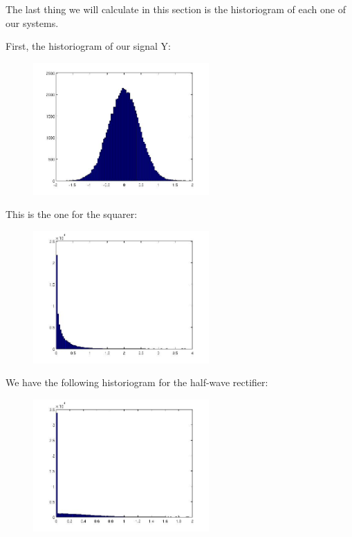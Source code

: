 \documentclass[a4paper,11pt]{article}
\begin{document}
The last thing we will calculate in this section is the historiogram of each one of our systems.

First, the historiogram of our signal Y:

\begin{figure}[!hp]
    \begin{center}
    \includegraphics[width=0.6\textwidth]{images/lab3_redo_33.jpg}
    \end{center}
\end{figure}

\newpage

This is the one for the squarer:

\begin{figure}[!hp]
    \begin{center}
    \includegraphics[width=0.6\textwidth]{images/lab3_redo_34.jpg}
    \end{center}
\end{figure}

We have the following historiogram for the half-wave rectifier:

\begin{figure}[!hp]
    \begin{center}
    \includegraphics[width=0.6\textwidth]{images/lab3_redo_35.jpg}
    \end{center}
\end{figure}
\end{document}

